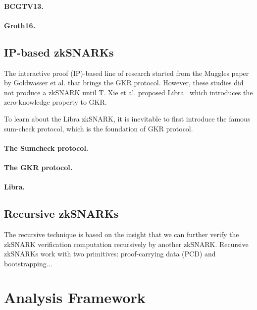 \documentclass[acmtog]{acmart}
\begin{document}
\paragraph{BCGTV13.}

\paragraph{Groth16.}

\subsection{IP-based zkSNARKs}
\label{sec:ip.based}

The interactive proof (IP)-based line of research started from the Muggles paper~\cite{GoldwasserKR08} by Goldwasser et al. that brings the GKR protocol.
However, these studies did not produce a zkSNARK until T. Xie et al. proposed Libra~\cite{XieZZPS19} which introduces the zero-knowledge property to GKR.

To learn about the Libra zkSNARK, it is inevitable to first introduce the famous sum-check protocol, which is the foundation of GKR protocol.

\paragraph{The Sumcheck protocol.}

\paragraph{The GKR protocol.}

\paragraph{Libra.}

\subsection{Recursive zkSNARKs}
\label{sec:recursive}

The recursive technique is based on the insight that we can further verify the zkSNARK verification computation recursively by another zkSNARK.
Recursive zkSNARKs work with two primitives: proof-carrying data (PCD) and bootstrapping...

\section{Analysis Framework}
\label{sec:analysis}
\end{document}
